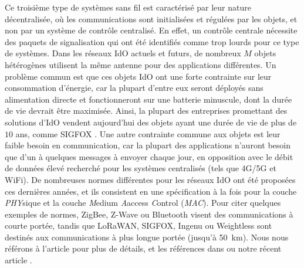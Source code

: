 \begin{resume_fr}
Ce troisième type de systèmes sans fil est caractérisé par leur nature décentralisée,
où les communications sont initialisées et régulées par les objets, et non par un système de contrôle centralisé.
%
En effet, un contrôle centrale nécessite des paquets de signalisation qui ont été identifiés comme trop lourds pour ce type de systèmes.
Dans les réseaux IdO actuels et futurs, de nombreux $M$ objets hétérogènes utilisent la même antenne pour des applications différentes.
Un problème commun est que ces objets IdO ont une forte contrainte sur leur consommation d'énergie, car la plupart d'entre eux seront déployés sans alimentation directe et fonctionneront sur une batterie minuscule, dont la durée de vie devrait être maximisée.
Ainsi, la plupart des entreprises promettant des solutions d'IdO vendent aujourd'hui des objets ayant une durée de vie de plus de $10$ ans, comme SIGFOX \cite{Centenaro16}.
Une autre contrainte commune aux objets est leur faible besoin en communication, car la plupart des applications n'auront besoin que d'un à quelques messages à envoyer chaque jour, en opposition avec le débit de données élevé recherché pour les systèmes centralisés (tels que 4G/5G et WiFi).
%
De nombreuses normes différentes pour les réseaux IdO ont été proposées ces dernières années,
et ils consistent en une spécification à la fois pour la couche \emph{PHY}sique
et la couche \emph{M}edium \emph{A}access \emph{C}ontrol (\emph{MAC}).
Pour citer quelques exemples de normes, ZigBee, Z-Wave ou Bluetooth visent des communications à courte portée, tandis que LoRaWAN, SIGFOX, Ingenu ou Weightless sont destinés aux communications à plus longue portée (jusqu'à \SI{50}{\kilo\meter}).
Nous nous référons à l'article \cite{Centenaro16} pour plus de détails, et les références dans \cite{Azari18} ou notre récent article \cite{MoyBesson2019}.



\end{resume_fr}
